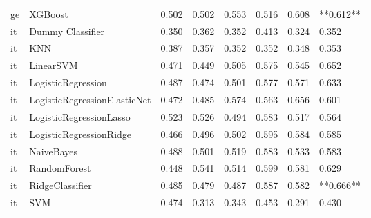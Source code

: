 \begin{tabular}{llllllll}
      ge &                      XGBoost & 0.502 &                     0.502 &                 0.553 &                  0.516 &                                   0.608 & **0.612** \\
      it &             Dummy Classifier & 0.350 &                     0.362 &                 0.352 &                  0.413 &                                   0.324 &     0.352 \\
      it &                          KNN & 0.387 &                     0.357 &                 0.352 &                  0.352 &                                   0.348 &     0.353 \\
      it &                    LinearSVM & 0.471 &                     0.449 &                 0.505 &                  0.575 &                                   0.545 &     0.652 \\
      it &           LogisticRegression & 0.487 &                     0.474 &                 0.501 &                  0.577 &                                   0.571 &     0.633 \\
      it & LogisticRegressionElasticNet & 0.472 &                     0.485 &                 0.574 &                  0.563 &                                   0.656 &     0.601 \\
      it &      LogisticRegressionLasso & 0.523 &                     0.526 &                 0.494 &                  0.583 &                                   0.517 &     0.564 \\
      it &      LogisticRegressionRidge & 0.466 &                     0.496 &                 0.502 &                  0.595 &                                   0.584 &     0.585 \\
      it &                   NaiveBayes & 0.488 &                     0.501 &                 0.519 &                  0.583 &                                   0.533 &     0.583 \\
      it &                 RandomForest & 0.448 &                     0.541 &                 0.514 &                  0.599 &                                   0.581 &     0.629 \\
      it &              RidgeClassifier & 0.485 &                     0.479 &                 0.487 &                  0.587 &                                   0.582 & **0.666** \\
      it &                          SVM & 0.474 &                     0.313 &                 0.343 &                  0.453 &                                   0.291 &     0.430 \\

\end{tabular}
